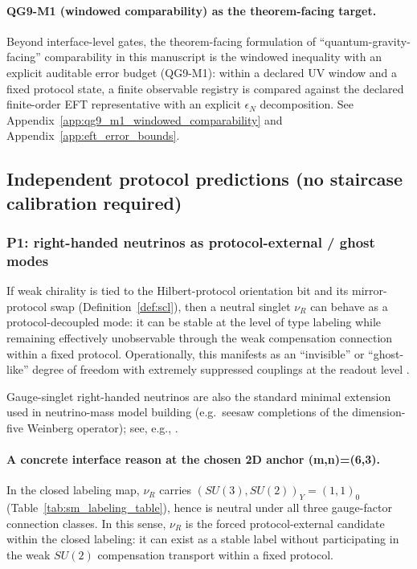\paragraph{QG9-M1 (windowed comparability) as the theorem-facing target.}
\AuditTag Beyond interface-level gates, the theorem-facing formulation of ``quantum-gravity-facing'' comparability in this manuscript is
the windowed inequality with an explicit auditable error budget (QG9-M1):
within a declared UV window and a fixed protocol state, a finite observable registry is compared against the declared finite-order EFT representative
with an explicit $\epsilon_N$ decomposition.
See Appendix~\ref{app:qg9_m1_windowed_comparability} and Appendix~\ref{app:eft_error_bounds}.

\subsection{Independent protocol predictions (no staircase calibration required)}
\label{subsec:independent_protocol_predictions}

\subsubsection{P1: right-handed neutrinos as protocol-external / ghost modes}
\label{subsec:p1_rh_neutrino}

If weak chirality is tied to the Hilbert-protocol orientation bit and its mirror-protocol swap (Definition~\ref{def:scl}), then a neutral singlet $\nu_R$ can behave as a protocol-decoupled mode: it can be stable at the level of type labeling while remaining effectively unobservable through the weak compensation connection within a fixed protocol.
Operationally, this manifests as an ``invisible'' or ``ghost-like'' degree of freedom with extremely suppressed couplings at the readout level \cite{PDGRPP2024}.
\begin{remark}
Gauge-singlet right-handed neutrinos are also the standard minimal extension used in neutrino-mass model building (e.g.\ seesaw completions of the dimension-five Weinberg operator); see, e.g., \cite{Weinberg1979WeinbergOperator,Minkowski1977Seesaw,PDGRPP2024}.
\end{remark}
\paragraph{A concrete interface reason at the chosen 2D anchor (m,n)=(6,3).}
In the closed labeling map, $\nu_R$ carries $(SU(3),SU(2))_Y=(1,1)_0$ (Table~\ref{tab:sm_labeling_table}), hence is neutral under all three gauge-factor connection classes.
In this sense, $\nu_R$ is the forced protocol-external candidate within the closed labeling: it can exist as a stable label without participating in the weak $SU(2)$ compensation transport within a fixed protocol.
